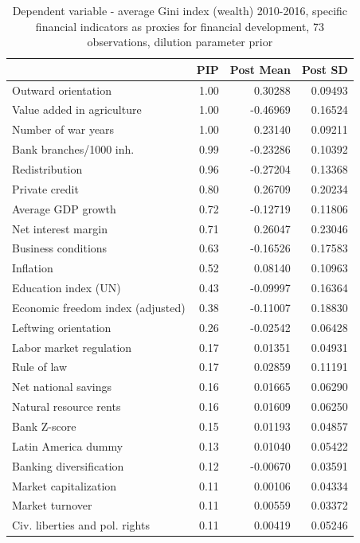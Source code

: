 \documentclass[a4paper,11pt]{article}
\begin{document}
\begin{table}[!ht]
\footnotesize
\centering
\caption{Dependent variable - average Gini index (wealth) 2010-2016, specific financial indicators as proxies for financial development, 73 observations, dilution parameter prior}
\label{table:res5}
\begin{tabular}{lrrr}
  \toprule
 & PIP & Post Mean & Post SD \\ 
  \midrule
  Outward orientation & 1.00 & 0.30288 & 0.09493 \\ 
  Value added in agriculture & 1.00 & -0.46969 & 0.16524 \\ 
  Number of war years & 1.00 & 0.23140 & 0.09211 \\ 
  Bank branches/1000 inh. & 0.99 & -0.23286 & 0.10392 \\ 
  Redistribution & 0.96 & -0.27204 & 0.13368 \\ 
  Private credit & 0.80 & 0.26709 & 0.20234 \\ 
  Average GDP growth & 0.72 & -0.12719 & 0.11806 \\ 
  Net interest margin & 0.71 & 0.26047 & 0.23046 \\ 
  Business conditions & 0.63 & -0.16526 & 0.17583 \\ 
  Inflation & 0.52 & 0.08140 & 0.10963 \\ 
  Education index (UN) & 0.43 & -0.09997 & 0.16364 \\ 
  Economic freedom index (adjusted) & 0.38 & -0.11007 & 0.18830 \\ 
  Leftwing orientation & 0.26 & -0.02542 & 0.06428 \\ 
  Labor market regulation & 0.17 & 0.01351 & 0.04931 \\ 
  Rule of law & 0.17 & 0.02859 & 0.11191 \\ 
  Net national savings & 0.16 & 0.01665 & 0.06290 \\ 
  Natural resource rents & 0.16 & 0.01609 & 0.06250 \\ 
  Bank Z-score & 0.15 & 0.01193 & 0.04857 \\ 
  Latin America dummy & 0.13 & 0.01040 & 0.05422 \\ 
  Banking diversification & 0.12 & -0.00670 & 0.03591 \\ 
  Market capitalization & 0.11 & 0.00106 & 0.04334 \\ 
  Market turnover & 0.11 & 0.00559 & 0.03372 \\ 
  Civ. liberties and pol. rights & 0.11 & 0.00419 & 0.05246 \\ 

\end{tabular}
\end{table}
\end{document}
